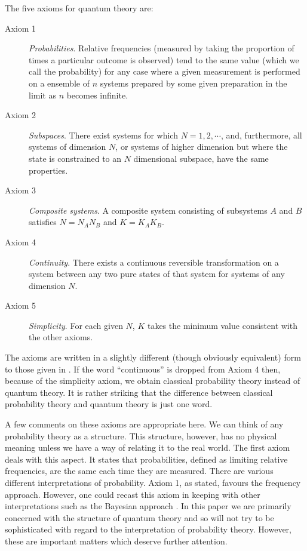 \documentclass[12pt]{article}
\begin{document}
The five axioms for quantum theory are:
\begin{description}
\item[Axiom 1] {\it Probabilities}.  Relative frequencies (measured by
taking the proportion of times a particular outcome is observed)
tend to the same value (which we call the probability) for any case
where a given measurement is performed on a ensemble of $n$ systems
prepared by some given preparation in the limit as $n$ becomes infinite.
\item[Axiom 2] {\it Subspaces}. There exist systems for which
$N=1,2,\cdots$, and, furthermore, all systems of dimension $N$, or
systems of higher
dimension but where the state is constrained to an $N$ dimensional
subspace, have the same properties.
\item[Axiom 3]  {\it Composite systems}. A composite system consisting of
subsystems $A$ and $B$ satisfies $N=N_AN_B$ and $K=K_AK_B$.
\item[Axiom 4] {\it Continuity}. There exists a continuous reversible
transformation on a system between any two pure states of that
system for systems of any dimension $N$.
\item[Axiom 5] {\it Simplicity}. For each given $N$, $K$ takes the
minimum value consistent with the other axioms.
\end{description}
The axioms are written in a slightly different (though obviously
equivalent) form to those given in \cite{Hardy1}.
If the word ``continuous'' is dropped from Axiom 4 then, because of the
simplicity axiom, we obtain classical probability theory instead of
quantum theory.  It is rather striking that the difference between
classical probability theory and quantum theory is just one word.

A few comments on these axioms are appropriate here.  We can think of
any probability theory as a structure.  This structure, however, has no
physical meaning unless we have a way of relating it to the real world.
The first axiom deals with this aspect.  It states that probabilities,
defined as limiting relative frequencies, are the same each time they
are measured.  There are various different interpretations of
probability.  Axiom 1, as stated, favours the frequency approach.
However, one could recast this axiom in keeping with other
interpretations such as the Bayesian approach \cite{schack}.
In this paper we are
primarily concerned with the structure of quantum theory and so will
not try to be sophisticated with regard to the interpretation of
probability theory.  However, these are important matters which
deserve further attention.
\end{document}
